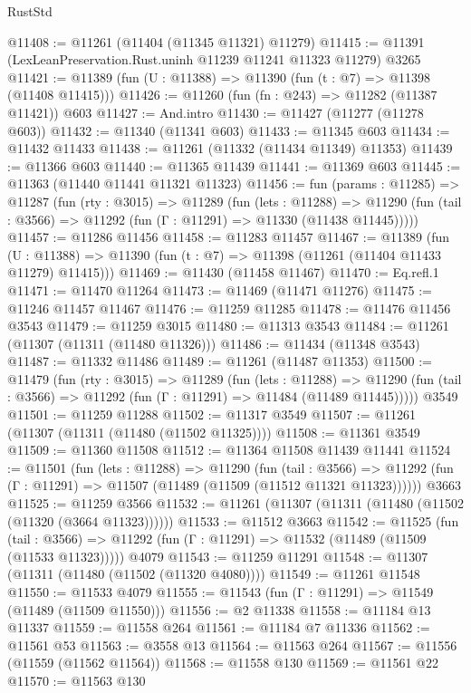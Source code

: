 \begin{lexlean}{RustStd}
\begin{coremodule}
@11408 := @11261 (@11404 (@11345 @11321) @11279)
@11415 := @11391 (LexLeanPreservation.Rust.uninh @11239 @11241 @11323 @11279) @3265
@11421 := @11389 (fun (U : @11388) => @11390 (fun (t : @7) => @11398 (@11408 @11415)))
@11426 := @11260 (fun (fn : @243) => @11282 (@11387 @11421)) @603
@11427 := And.intro
@11430 := @11427 (@11277 (@11278 @603))
@11432 := @11340 (@11341 @603)
@11433 := @11345 @603
@11434 := @11432 @11433
@11438 := @11261 (@11332 (@11434 @11349) @11353)
@11439 := @11366 @603
@11440 := @11365 @11439
@11441 := @11369 @603
@11445 := @11363 (@11440 @11441 @11321 @11323)
@11456 := fun (params : @11285) =>
  @11287
    (fun (rty : @3015) =>
    @11289
      (fun (lets : @11288) =>
      @11290 (fun (tail : @3566) => @11292 (fun (Γ : @11291) => @11330 (@11438 @11445)))))
@11457 := @11286 @11456
@11458 := @11283 @11457
@11467 := @11389
    (fun (U : @11388) => @11390 (fun (t : @7) => @11398 (@11261 (@11404 @11433 @11279) @11415)))
@11469 := @11430 (@11458 @11467)
@11470 := Eq.refl.{1}
@11471 := @11470 @11264
@11473 := @11469 (@11471 @11276)
@11475 := @11246 @11457 @11467
@11476 := @11259 @11285
@11478 := @11476 @11456 @3543
@11479 := @11259 @3015
@11480 := @11313 @3543
@11484 := @11261 (@11307 (@11311 (@11480 @11326)))
@11486 := @11434 (@11348 @3543)
@11487 := @11332 @11486
@11489 := @11261 (@11487 @11353)
@11500 := @11479
    (fun (rty : @3015) =>
    @11289
      (fun (lets : @11288) =>
      @11290 (fun (tail : @3566) => @11292 (fun (Γ : @11291) => @11484 (@11489 @11445)))))
    @3549
@11501 := @11259 @11288
@11502 := @11317 @3549
@11507 := @11261 (@11307 (@11311 (@11480 (@11502 @11325))))
@11508 := @11361 @3549
@11509 := @11360 @11508
@11512 := @11364 @11508 @11439 @11441
@11524 := @11501
    (fun (lets : @11288) =>
    @11290
      (fun (tail : @3566) =>
      @11292 (fun (Γ : @11291) => @11507 (@11489 (@11509 (@11512 @11321 @11323))))))
    @3663
@11525 := @11259 @3566
@11532 := @11261 (@11307 (@11311 (@11480 (@11502 (@11320 (@3664 @11323))))))
@11533 := @11512 @3663
@11542 := @11525
    (fun (tail : @3566) => @11292 (fun (Γ : @11291) => @11532 (@11489 (@11509 (@11533 @11323)))))
    @4079
@11543 := @11259 @11291
@11548 := @11307 (@11311 (@11480 (@11502 (@11320 @4080))))
@11549 := @11261 @11548
@11550 := @11533 @4079
@11555 := @11543 (fun (Γ : @11291) => @11549 (@11489 (@11509 @11550)))
@11556 := @2 @11338
@11558 := @11184 @13 @11337
@11559 := @11558 @264
@11561 := @11184 @7 @11336
@11562 := @11561 @53
@11563 := @3558 @13
@11564 := @11563 @264
@11567 := @11556 (@11559 (@11562 @11564))
@11568 := @11558 @130
@11569 := @11561 @22
@11570 := @11563 @130

\end{coremodule}
\end{lexlean}
